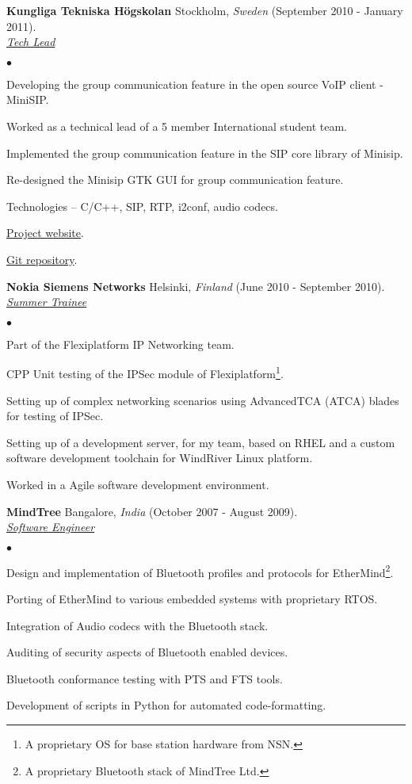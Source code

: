 \documentclass[a4paper]{article}
\newcommand{\employer}[4]{{ \textbf{#1} #2  (#3).\\ \underline{\emph{#4}}\\  }}
\newenvironment{achievements}{\begin{list}{$\bullet$}{\topsep 0pt \itemsep -2pt}}{\vspace*{4pt}\end{list}}
\begin{document}
\break
\employer{Kungliga Tekniska H\"{o}gskolan}{Stockholm, \textit{Sweden}}{September 2010 - January 2011}{Tech Lead}
  \begin{achievements}
  \item Developing the group communication feature in the open source VoIP client - MiniSIP.
  \item Worked as a technical lead of a 5 member International student team.
  \item Implemented the group communication feature in the SIP core library of Minisip.
  \item Re-designed the Minisip GTK GUI for group communication feature.
  \item Technologies – C/C++, SIP, RTP, i2conf, audio codecs.
  \item \href{https://archive.ssvl.kth.se/csd2010/csd.xen.ssvl.kth.se/csdlive/content/salcas.html}{Project website}.
  \item \href{https://github.com/dandugula/minisip_salcas}{Git repository}.
  \end{achievements}

\employer{Nokia Siemens Networks}{Helsinki, \textit{Finland}}{June 2010 - September 2010}{Summer Trainee}
	\begin{achievements}
  \item Part of the Flexiplatform IP Networking team.
	\item CPP Unit testing of the IPSec module of Flexiplatform\footnote[1]{A proprietary OS for base station hardware from NSN.}.
	\item Setting up of complex networking scenarios using AdvancedTCA (ATCA) blades for testing of IPSec.
	\item Setting up of a development server, for my team, based on RHEL and a custom software development toolchain for WindRiver Linux platform.
	\item Worked in a Agile software development environment.
	\end{achievements}

\employer{MindTree} {Bangalore, \textit{India}}{October 2007 - August 2009} {Software Engineer}
	\begin{achievements}
	\item Design and implementation of Bluetooth profiles and protocols for EtherMind\footnote[2]{A proprietary Bluetooth stack of MindTree Ltd.}.
	\item Porting of EtherMind to various embedded systems with proprietary RTOS.
	\item Integration of Audio codecs with the Bluetooth stack.
	\item Auditing of security aspects of Bluetooth enabled devices.
	\item Bluetooth conformance testing with PTS and FTS tools.
	\item Development of scripts in Python for automated code-formatting.
	\end{achievements}
\end{document}
